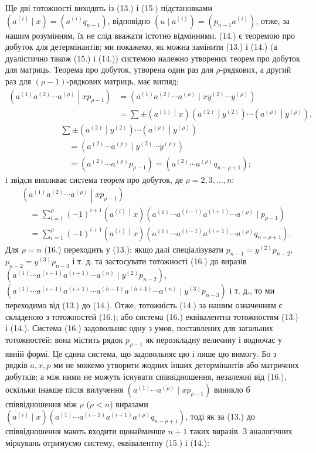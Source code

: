 \documentclass[11pt]{article}
\newcommand{\pair}[2]{\left(#1\middle|#2\right)}
\begin{document}
Ще дві тотожності виходять із (13.) і (15.) підстановками $(a^{(i)}\mid x)=(a^{(i)}q_{n-1})$, відповідно $(u\mid a^{(i)})=(p_{n-1}a^{(i)})$, отже, за нашим розумінням, їх не слід вважати істотно відмінними. (14.) є теоремою про добуток для детермінантів; ми покажемо, як можна замінити (13.) і (14.) (а дуалістично також (15.) і (14.)) системою належно утворених теорем про добуток для матриць. Теорема про добуток, утворена один раз для $\rho$-рядкових, а другий раз для $(\rho-1)$-рядкових матриць, має вигляд:
\[
\begin{aligned}
\pair{a^{(1)}a^{(2)}\cdots a^{(\rho)}}{xp_{\rho-1}}
&=(a^{(1)}a^{(2)}\cdots a^{(\rho)}\mid xy^{(2)}\cdots y^{(\rho)})\\
&=\sum\pm\pair{a^{(1)}}{x}\pair{a^{(2)}}{y^{(2)}}\cdots\pair{a^{(\rho)}}{y^{(\rho)}},
\end{aligned}
\]
\[
\begin{aligned}
&\sum\pm\pair{a^{(2)}}{y^{(2)}}\cdots\pair{a^{(\rho)}}{y^{(\rho)}}\\
&\quad=(a^{(2)}\cdots a^{(\rho)}\mid y^{(2)}\cdots y^{(\rho)})\\
&\quad=(a^{(2)}\cdots a^{(\rho)}p_{\rho-1})
=(a^{(2)}\cdots a^{(\rho)}q_{n-\rho+1});
\end{aligned}
\]
і звідси випливає система теорем про добуток, де $\rho=2,3,\ldots,n$:
\begin{equation}
\begin{aligned}
&\pair{a^{(1)}a^{(2)}\cdots a^{(\rho)}}{xp_{\rho-1}}\\
&\quad=\sum_{i=1}^{\rho}(-1)^{i+1}\pair{a^{(i)}}{x}
(a^{(1)}\cdots a^{(i-1)}a^{(i+1)}\cdots a^{(\rho)}\mid p_{\rho-1})\\
&\quad=\sum_{i=1}^{\rho}(-1)^{i+1}\pair{a^{(i)}}{x}
(a^{(1)}\cdots a^{(i-1)}a^{(i+1)}\cdots a^{(\rho)}q_{n-\rho+1}).
\end{aligned}
\tag{16}
\end{equation}
Для $\rho=n$ (16.) переходить у (13.); якщо далі спеціалізувати $p_{n-1}=y^{(2)}p_{n-2}$, $p_{n-2}=y^{(3)}p_{n-3}$ і т. д. та застосувати тотожності (16.) до виразів $(a^{(1)}\cdots a^{(i-1)}a^{(i+1)}\cdots a^{(n)}\mid y^{(2)}p_{n-2})$, $(a^{(1)}\cdots a^{(i-1)}a^{(i+1)}\cdots a^{(h-1)}a^{(h+1)}\cdots a^{(n)}\mid y^{(3)}p_{n-3})$ і т. д., то ми переходимо від (13.) до (14.). Отже, тотожність (14.) за нашим означенням є складеною з тотожностей (16.); або система (16.) еквівалентна тотожностям (13.) і (14.). Система (16.) задовольняє одну з умов, поставлених для загальних тотожностей: вона містить рядок $p_{\rho-1}$ як нерозкладну величину і водночас у явній формі. Це єдина система, що задовольняє цю і лише цю вимогу. Бо з рядків $a,x,p$ ми не можемо утворити жодних інших детермінантів або матричних добутків; а між ними не можуть існувати співвідношення, незалежні від (16.), оскільки інакше після вилучення $(a^{(1)}\cdots a^{(\rho)}\mid xp_{\rho-1})$ виникло б співвідношення між $\rho$ ($\rho<n$) виразами $(a^{(i)}\mid x)(a^{(1)}\cdots a^{(i-1)}a^{(i+1)}a^{(\rho)}q_{n-\rho+1})$, тоді як за (13.) до співвідношення мають входити щонайменше $n+1$ таких виразів. З аналогічних міркувань отримуємо систему, еквівалентну (15.) і (14.):
\end{document}
